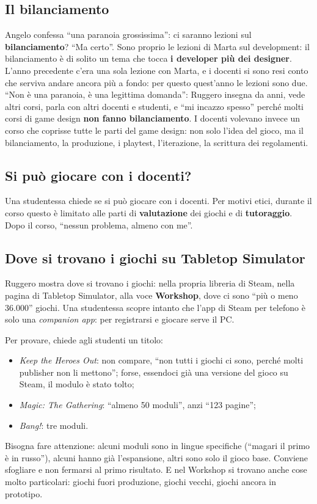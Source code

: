 \subsection{Il bilanciamento}

Angelo confessa ``una paranoia grossissima'': ci saranno lezioni sul
\textbf{bilanciamento}? ``Ma certo''. Sono proprio le lezioni di Marta sul
development: il bilanciamento è di solito un tema che tocca \textbf{i developer
più dei designer}. L'anno precedente c'era una sola lezione con Marta, e i
docenti si sono resi conto che serviva andare ancora più a fondo: per questo
quest'anno le lezioni sono due. ``Non è una paranoia, è una legittima domanda'':
Ruggero insegna da anni, vede altri corsi, parla con altri docenti e studenti, e
``mi incazzo spesso'' perché molti corsi di game design \textbf{non fanno
bilanciamento}. I docenti volevano invece un corso che coprisse tutte le parti
del game design: non solo l'idea del gioco, ma il bilanciamento, la produzione,
i playtest, l'iterazione, la scrittura dei regolamenti.

\subsection{Si può giocare con i docenti?}

Una studentessa chiede se si può giocare con i docenti. Per motivi etici,
durante il corso questo è limitato alle parti di \textbf{valutazione} dei giochi
e di \textbf{tutoraggio}. Dopo il corso, ``nessun problema, almeno con me''.

\subsection{Dove si trovano i giochi su Tabletop Simulator}

Ruggero mostra dove si trovano i giochi: nella propria libreria di Steam, nella
pagina di Tabletop Simulator, alla voce \textbf{Workshop}, dove ci sono ``più o
meno 36.000'' giochi. Una studentessa scopre intanto che l'app di Steam per
telefono è solo una \emph{companion app}: per registrarsi e giocare serve il
PC.

Per provare, chiede agli studenti un titolo:
\begin{itemize}
  \item \emph{Keep the Heroes Out}: non compare, ``non tutti i giochi ci sono,
        perché molti publisher non li mettono''; forse, essendoci già una
        versione del gioco su Steam, il modulo è stato tolto;
  \item \emph{Magic: The Gathering}: ``almeno 50 moduli'', anzi ``123 pagine'';
  \item \emph{Bang!}: tre moduli.
\end{itemize}
Bisogna fare attenzione: alcuni moduli sono in lingue specifiche (``magari il
primo è in russo''), alcuni hanno già l'espansione, altri sono solo il gioco
base. Conviene sfogliare e non fermarsi al primo risultato. E nel Workshop si
trovano anche cose molto particolari: giochi fuori produzione, giochi vecchi,
giochi ancora in prototipo.

